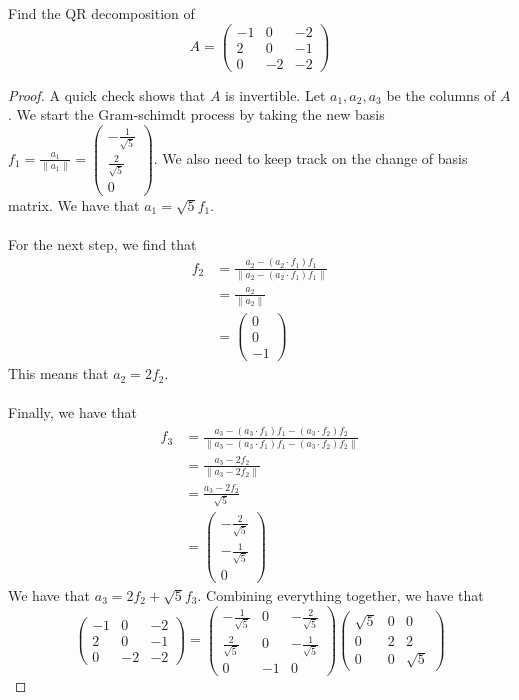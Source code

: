 \begin{eg}{}{} Find the QR decomposition of $$A=\begin{pmatrix}
-1 & 0 & -2\\
2 & 0 & -1\\
0 & -2 & -2
\end{pmatrix}$$ \tcbline
\begin{proof}
A quick check shows that $A$ is invertible. Let $a_1,a_2,a_3$ be the columns of $A$. We start the Gram-schimdt process by taking the new basis $f_1=\frac{a_1}{\|a_1\|}=\begin{pmatrix}-\frac{1}{\sqrt{5}}\\ \frac{2}{\sqrt{5}}\\ 0\end{pmatrix}$. We also need to keep track on the change of basis matrix. We have that $a_1=\sqrt{5}f_1$. \\~\\
For the next step, we find that 
\begin{align*}
f_2&=\frac{a_2-(a_2\cdot f_1)f_1}{\|a_2-(a_2\cdot f_1)f_1\|}\\
&=\frac{a_2}{\|a_2\|}\\
&=\begin{pmatrix} 0\\ 0\\ -1\end{pmatrix}
\end{align*}
This means that $a_2=2f_2$. \\~\\
Finally, we have that 
\begin{align*}
f_3&=\frac{a_3-(a_3\cdot f_1)f_1-(a_3\cdot f_2)f_2}{\|a_3-(a_3\cdot f_1)f_1-(a_3\cdot f_2)f_2\|}\\
&=\frac{a_3-2f_2}{\|a_3-2f_2\|}\\
&=\frac{a_3-2f_2}{\sqrt{5}}\\
&=\begin{pmatrix}-\frac{2}{\sqrt{5}}\\ -\frac{1}{\sqrt{5}}\\ 0\end{pmatrix}
\end{align*}
We have that $a_3=2f_2+\sqrt{5}f_3$. Combining everything together, we have that $$\begin{pmatrix}
-1 & 0 & -2\\
2 & 0 & -1\\
0 & -2 & -2
\end{pmatrix}=\begin{pmatrix}
-\frac{1}{\sqrt{5}} & 0 & -\frac{2}{\sqrt{5}}\\
\frac{2}{\sqrt{5}} & 0 & -\frac{1}{\sqrt{5}}\\
0 & -1 & 0
\end{pmatrix}\begin{pmatrix}
\sqrt{5} & 0 & 0\\
0 & 2 & 2\\
0 & 0 & \sqrt{5}
\end{pmatrix}$$
\end{proof}
\end{eg}

